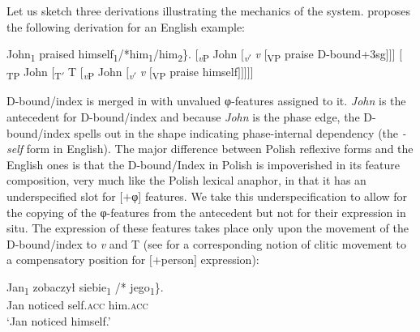 \documentclass[output=paper,modfonts,nonflat
]{langsci/langscibook}
\begin{document}
Let us sketch three derivations illustrating the mechanics of the system. \cite{safir2014} proposes the following derivation for an English example:

\ea\label{ex:witkos:9}
\ea John\textsubscript{1} praised \minsp{\{} himself\textsubscript{1}/*him\textsubscript{1}/him\textsubscript{2}\}.
\ex $[$\textsubscript{\textit{v}P} John $[$\textsubscript{\textit{v}$'$} \textit{v} $[$\textsubscript{VP} praise D-bound+3sg$]]]$
\ex $[$\textsubscript{TP} John $[$\textsubscript{T$'$} T $[$\textsubscript{\textit{v}P} John $[$\textsubscript{\textit{v}$'$} \textit{v} $[$\textsubscript{VP} praise himself$]]]]]$
\z\z


\noindent D-bound/index is merged in with unvalued φ-features assigned to it. \textit{John} is the antecedent for D-bound/index and because \textit{John} is the phase edge, the D-bound/index spells out in the shape indicating phase-internal dependency (the \textit{-self} form in English). The major difference between Polish reflexive forms and the English ones is that the D-bound/Index in Polish is impoverished in its feature composition, very much like the Polish lexical anaphor, in that it has an underspecified slot for [$+$φ] features. We take this underspecification to allow for the copying of the φ-features from the antecedent but not for their expression in situ. The expression of these features takes place only upon the movement of the D-bound/index to \textit{v} and T (see \citealt{bejar2003,franks2017} for a corresponding notion of clitic movement to a compensatory position for $[+$person$]$ expression):

\ea\label{ex:witkos:10}
\ea \gll Jan\textsubscript{1} zobaczył \minsp{\{} siebie\textsubscript{1} /*\hspace{-2pt} jego\textsubscript{1}\}. \label{ex:witkos:10a}\\
Jan noticed {} self.\textsc{acc} {} him.\textsc{acc}\\
\glt `Jan noticed himself.'

\end{document}
